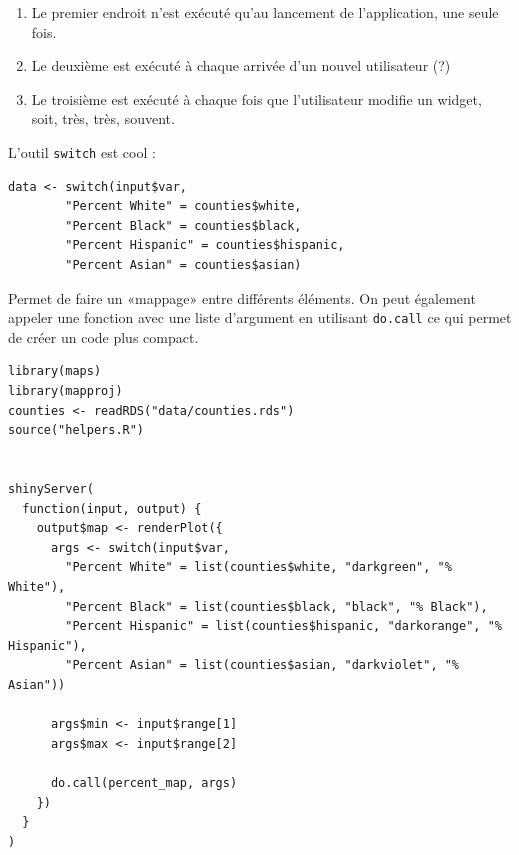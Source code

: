 \documentclass{article}
\begin{document}
\begin{enumerate}
\item Le premier endroit n'est exécuté qu'au lancement de l'application, une seule fois.
\item Le deuxième est exécuté à chaque arrivée d'un nouvel utilisateur (?)
\item Le troisième est exécuté à chaque fois que l'utilisateur modifie un widget, soit, très, très, souvent.
\end{enumerate}

L'outil \verb!switch! est cool : 
\begin{verbatim}
data <- switch(input$var, 
        "Percent White" = counties$white,
        "Percent Black" = counties$black,
        "Percent Hispanic" = counties$hispanic,
        "Percent Asian" = counties$asian)
\end{verbatim}
Permet de faire un «mappage» entre différents éléments.
On peut également appeler une fonction avec une liste d'argument en utilisant \verb!do.call! ce qui permet de créer un code plus compact.

\begin{verbatim}
library(maps)
library(mapproj)
counties <- readRDS("data/counties.rds")
source("helpers.R")
    
    
shinyServer(
  function(input, output) {
    output$map <- renderPlot({
      args <- switch(input$var,
        "Percent White" = list(counties$white, "darkgreen", "% White"),
        "Percent Black" = list(counties$black, "black", "% Black"),
        "Percent Hispanic" = list(counties$hispanic, "darkorange", "% Hispanic"),
        "Percent Asian" = list(counties$asian, "darkviolet", "% Asian"))
        
      args$min <- input$range[1]
      args$max <- input$range[2]
  
      do.call(percent_map, args)
    })
  }
)
\end{verbatim}
\end{document}
